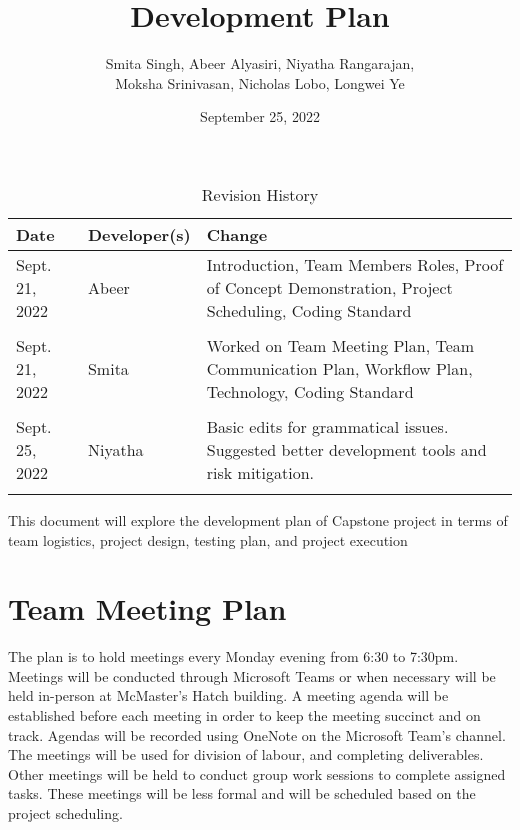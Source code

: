 \documentclass{article}
\title{Development Plan\\\prognam}
\author{Smita Singh, Abeer Alyasiri, Niyatha Rangarajan,\\ Moksha Srinivasan, Nicholas Lobo, Longwei Ye}
\date{September 25, 2022}
\begin{document}
\maketitle

\begin{table}[hp]
\caption{Revision History} \label{TblRevisionHistory}
\begin{tabularx}{\textwidth}{llX}
\toprule
\textbf{Date} & \textbf{Developer(s)} & \textbf{Change}\\
\midrule
Sept. 21, 2022 & Abeer & Introduction, Team Members Roles, Proof of Concept Demonstration, Project Scheduling, Coding Standard \\\\
Sept. 21, 2022 & Smita & Worked on Team Meeting Plan, Team Communication Plan, Workflow Plan, Technology, Coding Standard\\\\
Sept. 25, 2022 & Niyatha & Basic edits for grammatical issues. Suggested better 
 development tools and risk mitigation.\\\\
\bottomrule
\end{tabularx}
\end{table}

\newpage

\maketitle

This document will explore the development plan of Capstone project in terms of team logistics, project design, testing plan, and project execution %

\section{Team Meeting Plan}
The plan is to hold meetings every Monday evening from 6:30 to 7:30pm. Meetings will be conducted through Microsoft Teams or when necessary will be held in-person at McMaster's Hatch building. A meeting agenda will be established before each meeting in order to keep the meeting succinct and on track. Agendas will be recorded using OneNote on the Microsoft Team's channel. The meetings will be used for division of labour, and completing deliverables. %
Other meetings will be held to conduct group work sessions to complete assigned tasks. These meetings will be less formal and will be scheduled based on the project scheduling.
\end{document}
